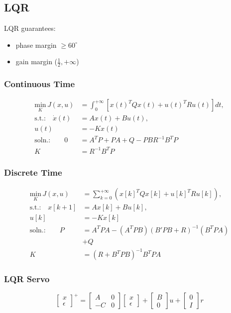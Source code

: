 \subsection{LQR}
LQR guarantees:
\begin{itemize}
    \item phase margin $\geq 60^\circ$
    \item gain margin ($\frac{1}{2}, +\infty$)
\end{itemize}

\subsubsection{Continuous Time}
    \vspace*{-0.4em}
    \begin{align*}
        \underset{K}{\text{min}} \, J(x,u) &= \int_{0}^{+\infty}[x(t)^TQx(t) + u(t)^TRu(t)]dt,\\[5pt]
        \text{s.t.:} \quad \dot{x}(t) &= Ax(t) + Bu(t),\\
        u(t) &= -Kx(t)\\[5pt]
        \text{soln.:} \qquad 0 &= A^TP + PA + Q - PBR^{-1}B^TP\\
        K &= R^{-1}B^TP
    \end{align*}

\subsubsection{Discrete Time}
    \vspace*{-0.4em}
    \begin{align*}
        \underset{K}{\text{min}} \, J(x,u) &= \sum_{k=0}^{+\infty}(x[k]^TQx[k] + u[k]^TRu[k]),\\[5pt]
        \text{s.t.:} \quad x[k+1] &= Ax[k] + Bu[k],\\
        u[k] &= -Kx[k]\\[5pt]
        \text{soln.:} \qquad P &= A^TPA - (A^TPB)(B'PB+R)^{-1}(B^TPA)\\
        &+Q\\
        K &= (R+B^TPB)^{-1}B^TPA
    \end{align*}

\subsubsection{LQR Servo}
    $$
    \begin{bmatrix} x \\ \epsilon \end{bmatrix} ^+
    = \begin{bmatrix} A & 0 \\ -C & 0 \end{bmatrix} \begin{bmatrix} x \\ \epsilon \end{bmatrix}
    + \begin{bmatrix} B \\ 0 \end{bmatrix} u + \begin{bmatrix} 0 \\ I \end{bmatrix} r
    $$